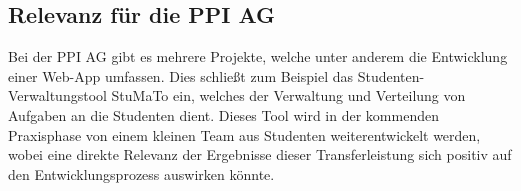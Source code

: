 \documentclass[11pt]{article}
\begin{document}
		\subsection{Relevanz für die PPI AG}
			Bei der PPI AG gibt es mehrere Projekte, welche unter anderem die Entwicklung einer Web-App umfassen. Dies schließt zum Beispiel das Studenten-Verwaltungstool StuMaTo ein, welches der Verwaltung und Verteilung von Aufgaben an die Studenten dient. Dieses Tool wird in der kommenden Praxisphase von einem kleinen Team aus Studenten weiterentwickelt werden, wobei eine direkte Relevanz der Ergebnisse dieser Transferleistung sich positiv auf den Entwicklungsprozess auswirken könnte.
			
			
	\clearpage
			
\end{document}
